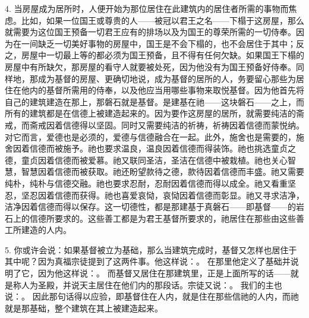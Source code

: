 4. 当房屋成为居所时，人便开始为那位居住在此建筑内的居住者所需的事物而焦虑。比如，如果一位国王或尊贵的人——被冠以君王之名——下榻于这房屋，那么就需要为这位国王预备一切君王应有的排场以及为国王的尊荣所需的一切侍奉。因为在一间缺乏一切美好事物的房屋中，国王是不会下榻的，也不会居住于其中；反之，房屋中一切最上等的都必须为国王预备，且不得有任何欠缺。如果国王下榻的房屋中有所缺欠，那房屋的看守人就要被处死，因为他没有为国王预备好侍奉。同样地，那成为基督的房屋、更确切地说，成为基督的居所的人，务要留心那些为居住在他内的基督所需用的侍奉，以及他应当用哪些事物来取悦基督。因为他首先将自己的建筑建造在那上，那磐石就是基督。是建基在祂——这块磐石——之上，而所有的建筑都是在信德上被建造起来的。因为要作这房屋的居所，就需要纯洁的斋戒，而斋戒因着信德得以坚固。同时又需要纯洁的祈祷，祈祷因着信德而蒙悦纳。对它而言，爱德也是必须的，爱德与信德融合在一起。此外，施舍也是需要的，施舍因着信德而被施予。祂也要求温良，温良因着信德而得装饰。祂也挑选童贞之德，童贞因着信德而被爱慕。祂又联同圣洁，圣洁在信德中被栽植。祂也关心智慧，智慧因着信德而被获取。祂还盼望款待之德，款待因着信德而丰盛。祂又需要纯朴，纯朴与信德交融。祂也要求忍耐，忍耐因着信德而得以成全。祂又看重坚忍，坚忍因着信德而获得。祂也喜爱哀恸，哀恸因着信德而彰显。祂又寻求洁净，洁净因着信德而得以保存。这一切德性，都是那建基于真磐石——即基督——的岩石上的信德所要求的。这些善工都是为君王基督所要求的，祂居住在那些由这些善工所建造的人内。\par

5. 你或许会说：如果基督被立为基础，那么当建筑完成时，基督又怎样也居住于其中呢？因为真福宗徒提到了这两件事。他这样说：。 在那里他定义了基础并说明了它，因为他这样说：。 而基督又居住在那建筑里，正是上面所写的话——就是称人为圣殿，并说天主居住在他们内的那段话。宗徒又说：。 我们的主也说：。 因此那句话得以应验，即基督住在人内，就是住在那些信祂的人内，而祂就是那基础，整个建筑在其上被建造起来。\par

